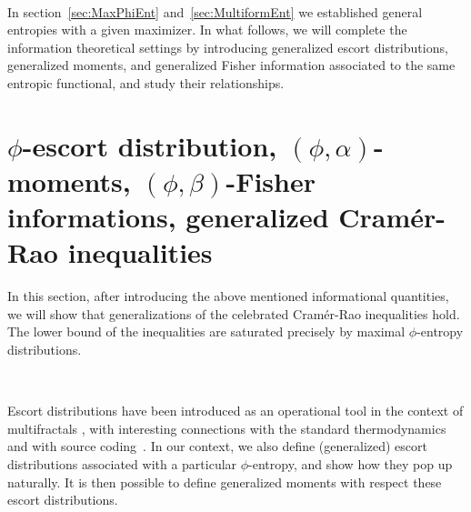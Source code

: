 \documentclass[english,sort&compress]{elsarticle}
\theoremstyle{definition}
\theoremstyle{plain}
\theoremstyle{plain}
\begin{document}
\

In section~\ref{sec:MaxPhiEnt} and~\ref{sec:MultiformEnt} we established general
entropies  with  a given  maximizer.   In what  follows,  we  will complete  the
information   theoretical    settings   by   introducing    generalized   escort
distributions,   generalized  moments,   and   generalized  Fisher   information
associated to the  same entropic functional, and study their relationships.



\section{$\phi$-escort           distribution,          $(\phi,\alpha)$-moments,
  $(\phi,\beta)$-Fisher informations,  generalized Cram\'er-Rao inequalities}
\label{sec:EscortCR}

In this section, after introducing the above mentioned informational quantities,
we will  show that generalizations  of the celebrated  Cram\'er-Rao inequalities
hold.  The  lower bound of the  inequalities are saturated  precisely by maximal
$\phi$-entropy distributions.

\

Escort distributions have been introduced  as an operational tool in the context
of  multifractals \cite{ChhJen89, BecSch93},  with interesting  connections with
the  standard thermodynamics~\cite{Nau11}  and  with source  coding~\cite{Cam65,
  Ber09}.   In our context,  we also  define (generalized)  escort distributions
associated with a particular $\phi$-entropy, and show how they pop up naturally.
It  is then possible  to define  generalized moments  with respect  these escort
distributions.
\end{document}

